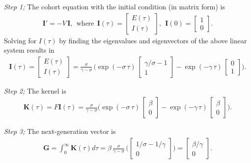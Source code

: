 \documentclass[12pt]{article}
\DeclareRobustCommand\_{\ifmmode\expandafter\subtxt\else\textunderscore\fi}
\renewcommand{\vec}[1]{\ensuremath{\mathbf{#1}}} %
\theoremstyle{definition} %
\begin{document}
{\it Step 1;} The cohort equation with the initial condition (in matrix form) is 
\begin{align}
\vec I'=-V\,\vec I,~~ \text{where}~~ \vec I(\tau)=\left[ \begin {array}{c} E(\tau)\\I(\tau) \end {array} \right], ~~
\vec I(0)=\left[ \begin {array}{c} 1\\0 \end {array} \right].
\end{align}
Solving for $I(\tau)$ by finding the eigenvalues and eigenvectors of the above linear system results in
\begin{align}
\vec I(\tau) = \left[ \begin {array}{c} E(\tau)\\I(\tau) \end {array} \right] =
\frac{\sigma}{\gamma-\sigma}\,\Big( \exp(-\sigma\,\tau)\,\left[ \begin {array}{c} \gamma/\sigma-1\\1 \end {array} \right] 
- \exp(-\gamma\,\tau)\,\left[ \begin {array}{c} 0\\1 \end {array} \right] \Big).
\end{align}

{\it Step 2;} The kernel is
\begin{align}
\vec K(\tau)= F \vec I(\tau)
= \frac{\sigma}{\gamma-\sigma} \Big(\exp(-\sigma\,\tau)\,\left[ \begin {array}{c} \beta\\0 \end {array} \right] 
 -\exp(-\gamma\,\tau)\,\left[ \begin {array}{c} \beta\\0 \end {array} \right]\Big).
\end{align}

{\it Step 3;} The next-generation vector is 
\begin{align}
\vec G=\int_0^\infty \vec K(\tau) d\tau
=\beta\,\frac{\sigma}{\gamma-\sigma}\,\Big(\left[ \begin{array}{c} 1/\sigma-1/\gamma\\0 \end{array} \right]\Big)
=\left[ \begin{array}{c} \beta/\gamma\\0 \end{array} \right].
\end{align}
\end{document}
